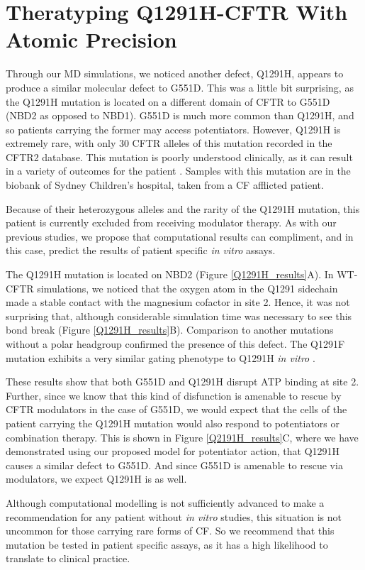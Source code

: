\section{Theratyping Q1291H-CFTR With Atomic Precision}

Through our MD simulations, we noticed another defect, Q1291H, appears to produce a similar molecular defect to G551D. This was a little bit surprising, as the Q1291H mutation is located on a different domain of CFTR to G551D (NBD2 as opposed to NBD1). G551D is much more common than Q1291H, and so patients carrying the former may access potentiators. However, Q1291H is extremely rare, with only 30 CFTR alleles of this mutation recorded in the CFTR2 database. This mutation is poorly understood clinically, as it can result in a variety of outcomes for the patient \cite{cftr2}. Samples with this mutation are in the biobank of Sydney Children's hospital, taken from a CF afflicted patient. 

Because of their heterozygous alleles and the rarity of the Q1291H mutation, this patient is currently excluded from receiving modulator therapy. As with our previous studies, we propose that computational results can compliment, and in this case, predict the results of patient specific \textit{in vitro} assays. 

The Q1291H mutation is located on NBD2 (Figure \ref{Q1291H_results}A). In WT-CFTR simulations, we noticed that the oxygen atom in the  Q1291 sidechain made a stable contact with the magnesium cofactor in site 2. Hence, it was not surprising that, although considerable simulation time was necessary to see this bond break (Figure \ref{Q1291H_results}B). Comparison to another mutations without a polar headgroup confirmed the presence of this defect. The Q1291F mutation exhibits a very similar gating phenotype to Q1291H \textit{in vitro} \cite{dong2015}. 

These results show that both G551D and Q1291H disrupt ATP binding at site 2. Further, since we know that this kind of disfunction is amenable to rescue by CFTR modulators in the case of G551D, we would expect that the cells of the patient carrying the Q1291H mutation would also respond to potentiators or combination therapy. This is shown in Figure \ref{Q2191H_results}C, where we have demonstrated using our proposed model for potentiator action, that Q1291H causes a similar defect to G551D. And since G551D is amenable to rescue via modulators, we expect Q1291H is as well. 

Although computational modelling is not sufficiently advanced to make a recommendation for any patient without \textit{in vitro} studies, this situation is not uncommon for those carrying rare forms of CF. So we recommend that this mutation be tested in patient specific assays, as it has a high likelihood to translate to clinical practice. 

